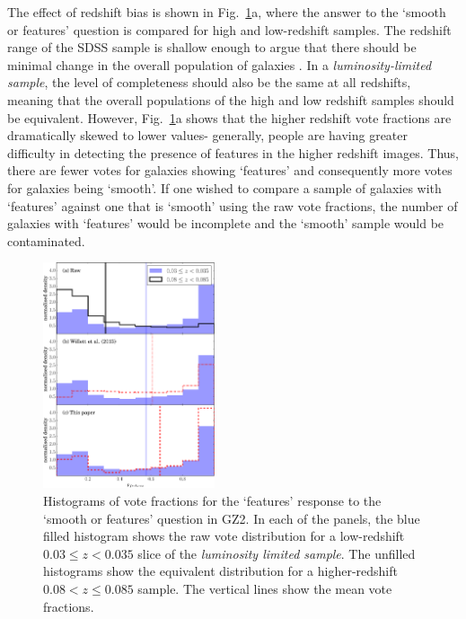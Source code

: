 \documentclass[useAMS,usenatbib]{mn2e}
\begin{document}
The effect of redshift bias is shown in Fig.~\ref{fig:vote_histograms}a, where the answer to the `smooth or features' question is compared for high and low-redshift samples. The redshift range of the SDSS sample is shallow enough to argue that there should be minimal change in the overall population of galaxies \citep{Bamford_09,Willett_13}. In a \textit{luminosity-limited sample}, the level of completeness should also be the same at all redshifts, meaning that the overall populations of the high and low redshift samples should be equivalent. However, Fig.~\ref{fig:vote_histograms}a shows that the higher redshift vote fractions are dramatically skewed to lower values- generally, people are having greater difficulty in detecting the presence of features in the higher redshift images. Thus, there are fewer votes for galaxies showing `features' and consequently more votes for galaxies being `smooth'. If one wished to compare a sample of galaxies with `features' against one that is `smooth' using the raw vote fractions, the number of galaxies with `features' would be incomplete and the `smooth' sample would be contaminated.

\begin{figure}
		\centering

        \includegraphics[width=0.45\textwidth]{Images/Bias/Biases/comparison_histogram.pdf}

        \caption{Histograms of vote fractions for the `features' response to the `smooth or features' question in GZ2. In each of the panels, the blue filled histogram shows the raw vote distribution for a low-redshift $0.03 \leq z < 0.035$ slice of the \textit{luminosity limited sample}. The unfilled histograms show the equivalent distribution for a higher-redshift $0.08 < z \leq 0.085$ sample. The vertical lines show the mean vote fractions.}

        \label{fig:vote_histograms}

\end{figure}
\end{document}
